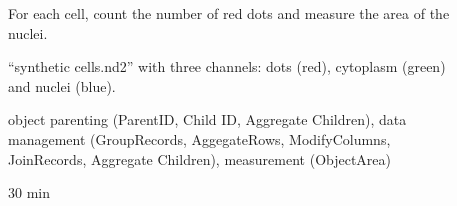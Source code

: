 \pagebreak
{}

\begin{description}
    \item[] For each cell, count the number of red dots and measure the area of the nuclei.
    \item[] “synthetic cells.nd2” with three channels: dots (red), cytoplasm (green) and nuclei (blue). 
    \item[] object parenting (ParentID, Child ID, Aggregate Children), data management (GroupRecords, AggegateRows, ModifyColumns, JoinRecords, Aggregate Children), measurement (ObjectArea)
    \item[] 30 min
    \item[]
\end{description}

